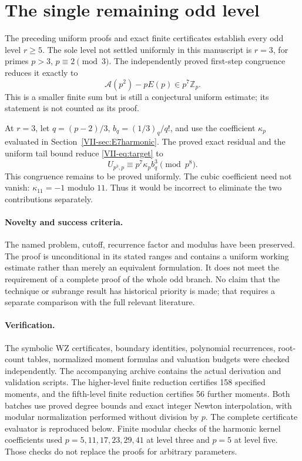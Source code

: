 \documentclass[11pt,letterpaper]{article}
\numberwithin{equation}{section}
\begin{document}
\section{The single remaining odd level}\label{loc-VII-18}
The preceding uniform proofs and exact finite certificates establish
every odd level $r\ge5$. The sole level not settled uniformly in this
manuscript is $r=3$, for primes $p>3$, $p\equiv2\pmod3$.
The independently proved first-step congruence reduces it exactly to
\[
 \boxed{\mathcal A(p^2)-pE(p)\in p^7\mathbb Z_p.}
\]
This is a smaller finite sum but is still a conjectural uniform
estimate; its statement is not counted as its proof.

At $r=3$, let $q=(p-2)/3$, $b_q=(1/3)_q/q!$, and use the
coefficient $\kappa_p$ evaluated in Section~\ref{VII-sec:E7harmonic}.
The proved exact residual and the uniform tail bound reduce
\eqref{VII-eq:target} to
\[
 U_{p^3,p}\equiv p^7\kappa_p b_q^3\pmod{p^8}.
\]
This congruence remains to be proved uniformly. The cubic coefficient
need not vanish: $\kappa_{11}=-1$ modulo $11$. Thus it would be
incorrect to eliminate the two contributions separately.

\paragraph{Novelty and success criteria.}
The named problem, cutoff, recurrence factor and modulus have been
preserved. The proof is unconditional in its stated ranges and
contains a uniform working estimate rather than merely an equivalent
formulation. It does not meet the requirement of a complete proof of
the whole odd branch. No claim that the technique or subrange result
has historical priority is made; that requires a separate comparison
with the full relevant literature.

\paragraph{Verification.}
The symbolic WZ certificates, boundary identities, polynomial
recurrences, root-count tables, normalized moment formulas and
valuation budgets were checked independently. The accompanying
archive contains the actual derivation and validation scripts.
The higher-level finite reduction certifies 158 specified moments,
and the fifth-level finite reduction certifies 56 further moments.
Both batches use proved degree bounds and exact integer Newton
interpolation, with modular normalization performed without division
by $p$. The complete certificate evaluator is reproduced below.
Finite modular checks of the harmonic kernel coefficients used
$p=5,11,17,23,29,41$ at level three and $p=5$ at level five.
Those checks do not replace the proofs for arbitrary parameters.
\end{document}
